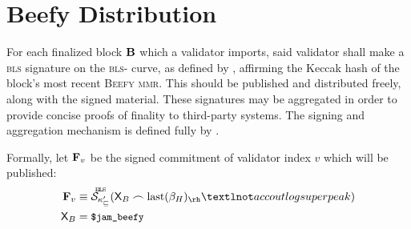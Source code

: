 \section{Beefy Distribution}
\label{sec:beefy}

For each finalized block $\mathbf{B}$ which a validator imports, said validator shall make a \textsc{bls} signature on the \textsc{bls}- curve, as defined by \cite{bls12-381}, affirming the Keccak hash of the block's most recent \textsc{Beefy} \textsc{mmr}. This should be published and distributed freely, along with the signed material. These signatures may be aggregated in order to provide concise proofs of finality to third-party systems. The signing and aggregation mechanism is defined fully by \cite{cryptoeprint:2022/1611}.

Formally, let $\mathbf{F}_{v}$ be the signed commitment of validator index $v$ which will be published:
\begin{align}\label{eq:beefysignedcommitment}
  \beefycommitment{v} &\equiv \blssigndata{\activeset'\sub{v}}{\Xbeefy \concat \text{last}(\recenthistory)_\rh¬accoutlogsuperpeak}\\
  \Xbeefy &= \token{\$jam\_beefy}
\end{align}
